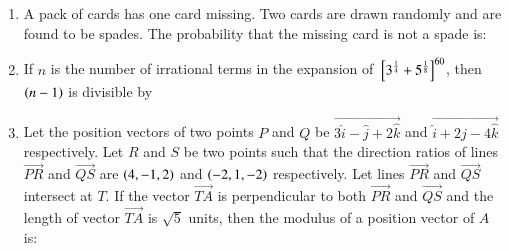\documentclass[journal]{IEEEtran}
\numberwithin{equation}{enumi}
\numberwithin{figure}{enumi}
\begin{document}
\begin{enumerate}
    \item 
    A pack of cards has one card missing. Two cards are drawn randomly and are found to be spades. The probability that the missing card is not a spade is:
    \begin{enumerate}
    \end{enumerate}

    \item 
    If $n$ is the number of irrational terms in the expansion of ${}\left[3^{\frac{1}{4}} + 5^{\frac{1}{8}}\right]^{60}$, then $\left(n - 1\right)$ is divisible by
    \begin{enumerate}
    \end{enumerate}

    \item 
    Let the position vectors of two points $P$ and $Q$ be $\vec{3\hat{i} - \hat{j} + 2\hat{k}}$ and $\vec{\hat{i} + 2\hat{j} - 4\hat{k}}$ respectively. Let $R$ and $S$ be two points such that the direction ratios of lines $\vec{PR}$ and $\vec{QS}$ are $\left(4, -1, 2\right)$ and $\left(-2,1,-2\right)$ respectively. Let lines $\vec{PR}$ and $\vec{QS}$ intersect at $T$. If the vector $\vec{TA}$ is perpendicular to both $\vec{PR}$ and $\vec{QS}$ and the length of vector $\vec{TA}$ is $\sqrt{5}$ units, then the modulus of a position vector of $A$ is:
    \begin{enumerate}
    \end{enumerate}


\end{enumerate}
\end{document}
